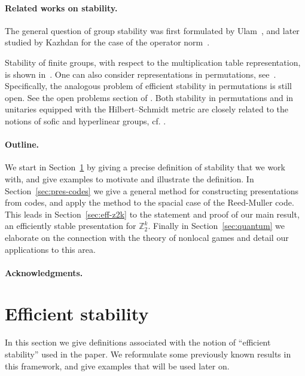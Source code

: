 \documentclass[11pt]{article}
\theoremstyle{definition}
\newcommand{\Z}{\ensuremath{\mathbb{Z}}}
\begin{document}
\paragraph{Related works on stability.} The general question of group stability was first formulated by Ulam~\cite{ulam1960collection}, and later studied by Kazhdan for the case of the operator norm~\cite{kazhdan1982e}. 

Stability of finite groups, with respect to the multiplication table representation, is shown in~\cite{gowers2017inverse}. 
One can also consider representations in permutations, see~\cite{glebsky2009almost,becker2022stability}.  Specifically, the analogous problem of efficient stability in permutations is still open. See the open problems section of \cite{CL_part2}. Both stability in permutations and in unitaries equipped with the Hilbert--Schmidt metric are closely related to the notions of sofic and hyperlinear groups, cf. \cite{glebsky2009almost,becker2020group}. 



\paragraph{Outline.}
We start in Section~\ref{sec:efficient} by giving a precise definition of stability that we work with, and give examples to motivate and illustrate the definition. In Section~\ref{sec:pres-codes} we give a general method for constructing presentations from codes, and apply the method to the spacial case of the Reed-Muller code. This leads in Section~\ref{sec:eff-z2k} to the statement and proof of our main result, an efficiently stable presentation for $\Z_2^k$. Finally in Section~\ref{sec:quantum} we elaborate on the connection with the theory of nonlocal games and detail our applications to this area. 




\paragraph{Acknowledgments.}


\section{Efficient stability}
\label{sec:efficient}

In this section we give definitions associated with the notion of ``efficient stability'' used in the paper. We reformulate some previously known results in this framework, and give examples that will be used later on. 
\end{document}
